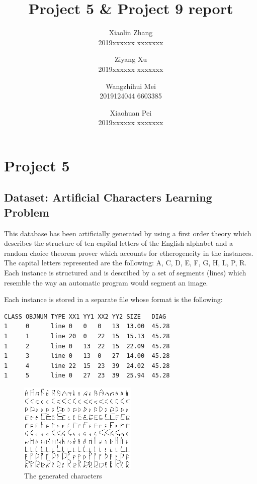 \documentclass[11pt,en,cite=authoryear]{elegantpaper}
\title{Project 5 \& Project 9 report}
\author{Xiaolin Zhang \\ 2019xxxxxx xxxxxxx \and Ziyang Xu \\2019xxxxxx xxxxxxx  \and Wangzhihui Mei \\ 2019124044 6603385  \and Xiaohuan Pei \\ 2019xxxxxx xxxxxxx}
\institute{CCNU-UOW JI}
\date{}
\begin{document}
\maketitle


\section{Project 5}
\subsection{Dataset: Artificial Characters Learning Problem}

This database has been artificially generated by using a first order theory which describes the structure of ten capital letters of the English alphabet and a random choice theorem prover which accounts for etherogeneity in the instances. The capital letters represented are the following: A, C, D, E, F, G, H, L, P, R. Each instance is structured and is described by a set of segments (lines) which resemble the way an automatic program would segment an image. 


Each instance is stored in a separate file whose format is the following:
\begin{lstlisting}
CLASS OBJNUM TYPE XX1 YY1 XX2 YY2 SIZE   DIAG
1     0      line 0   0   0   13  13.00  45.28
1     1      line 20  0   22  15  15.13  45.28
1     2      line 0   13  22  15  22.09  45.28
1     3      line 0   13  0   27  14.00  45.28
1     4      line 22  15  23  39  24.02  45.28
1     5      line 0   27  23  39  25.94  45.28
\end{lstlisting}

\begin{figure}[h]
	\centering
	\includegraphics[width=0.5\textwidth]{image/chars}
	\caption{The generated characters}
	\label{chars}
\end{figure}
\end{document}

